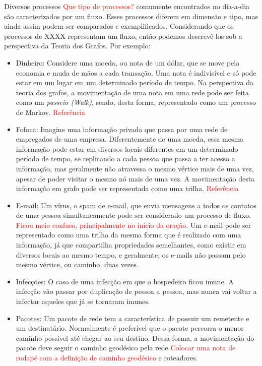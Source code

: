 Diversos processos \textcolor{red}{Que tipo de processos?} comumente encontrados no dia-a-dia são caracterizados por um fluxo. Esses processos diferem em dimensão e tipo, mas ainda assim podem ser comparados e exemplificados. Considerando que os processos de XXXX representam um fluxo, então podemos descrevê-los sob a perspectiva da Teoria dos Grafos\cite{ceflow}. Por exemplo:

\begin{itemize}
\item Dinheiro: Considere uma moeda, ou nota de um dólar, que se move pela
economia e muda de mãos a cada transação. Uma nota é indivisível e só pode estar em um lugar em um determinado período de tempo. Na perspectiva da teoria dos grafos, a movimentação de uma nota em uma rede pode ser feita como um \textit{passeio (Walk)}, sendo, desta forma, representado como um processo de Markov. \textcolor{red}{Referência}
\item Fofoca: Imagine uma informação privada que passa por uma rede
de empregados de uma empresa. Diferentemente de uma moeda, essa mesma informação pode estar em diversos locais diferentes em um determinado período de tempo, se replicando a cada pessoa que passa a ter acesso a informação, mas geralmente não atravessa o mesmo vértice mais de uma vez, apesar de poder visitar o mesmo nó mais de uma vez. A movimentação desta informação em grafo pode ser representada como uma trilha. \textcolor{red}{Referência}
\item E-mail: Um vírus, o spam de e-mail, que envia mensagens a todos os
contatos de uma pessoa simultaneamente pode ser considerado um processo de fluxo. \textcolor{red}{Ficou meio confuso, principalmente no início da oração}. Um e-mail pode ser representado como uma trilha da mesma forma que é realizado com uma informação, já que compartilha propriedades semelhantes, como existir em diversos locais ao mesmo tempo, e geralmente, os e-mails não passam pelo mesmo vértice, ou caminho, duas vezes.
\item Infecções: O caso de uma infecção em que o hospedeiro ficou imune.
A infecção vão passar por duplicação de pessoa a pessoa, mas nunca vai voltar a infectar aqueles que já se tornaram imunes.
\item Pacotes: Um pacote de rede tem a característica de possuir
um remetente e um destinatário. Normalmente é preferível que o pacote percorra o menor caminho possível até chegar ao seu destino. Dessa forma, a movimentação do pacote deve seguir o caminho geodésico pela rede \textcolor{red}{Colocar uma nota de rodapé com a definição de caminho geodésico} e roteadores. 
\end{itemize}

